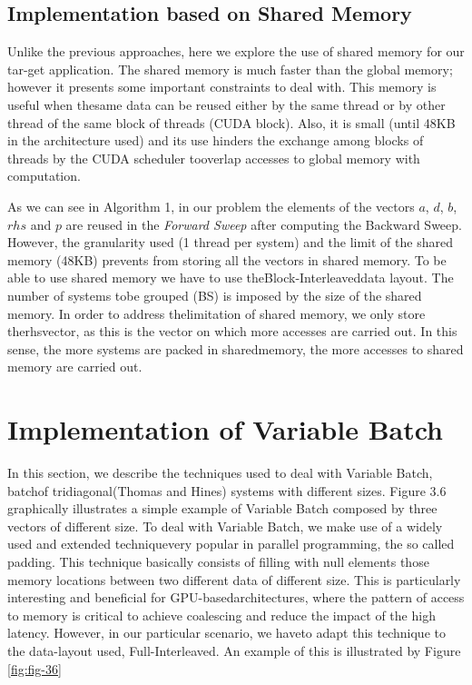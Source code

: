 \subsection*{Implementation based on Shared Memory}
Unlike the previous approaches, here we explore the use of shared
 memory for our tar-get application.  
 The shared memory is much faster than the global memory; 
 however it presents some important constraints to deal with. 
  This memory is useful when thesame  data  can  be  reused  either 
   by  the  same  thread  or  by  other  thread  of  the  same block 
   of threads (CUDA block).  Also, it is small (until 48KB in the 
    architecture used) and its use hinders the exchange among blocks
    of threads by the CUDA scheduler tooverlap accesses to global memory
     with computation.

 As we can see in Algorithm 1, in our problem the elements of the
vectors $a$, $d$, $b$, $rhs$ and $p$ are reused in the \textit{Forward 
 Sweep} after computing the Backward Sweep. However, the granularity used 
 (1 thread per system) and the limit of the shared memory (48KB) prevents
  from storing all the vectors in shared memory. To be able to use 
  shared memory we have to use theBlock-Interleaveddata layout.  
  The number of systems tobe grouped (BS) is imposed by the size of
   the shared memory.  In order to address thelimitation of shared 
   memory, we only store therhsvector, as this is the vector on which 
   more accesses are carried out.  In this sense,  the more systems 
   are packed in sharedmemory, the more accesses to shared memory 
   are carried out.


\vspace{10ex}
\section{Implementation of Variable Batch}

In  this  section,  we  describe  the  techniques  used  to  deal
with  Variable  Batch,  batchof tridiagonal(Thomas and Hines) 
systems with different sizes.  Figure 3.6 graphically illustrates a 
simple example of Variable Batch composed by three vectors of 
different size.  To deal with Variable Batch, we make use of a 
widely used and extended techniquevery popular in parallel
programming, the so called padding.  This technique basically consists
of  filling  with  null  elements  those  memory  locations  between  two  different data
of  different  size.   This  is  particularly  interesting  and  
beneficial  for  GPU-basedarchitectures, where the pattern of 
access to memory is critical to achieve coalescing and reduce the 
impact of the high latency.  However, in our particular scenario, 
we haveto adapt this technique to the data-layout used, 
Full-Interleaved.  An example of this is illustrated by Figure \ref{fig:fig-36}

